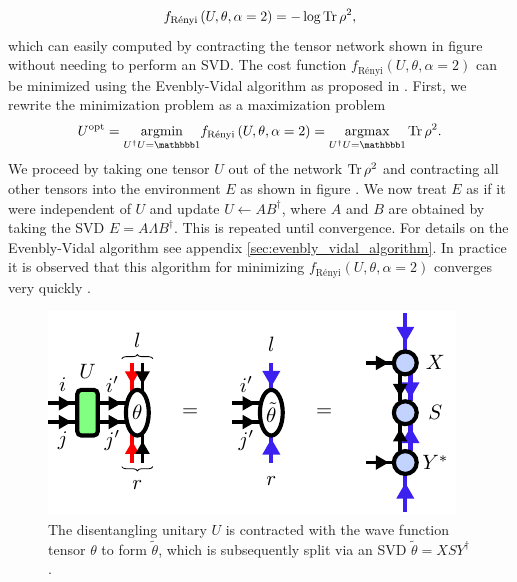 \begin{equation}
	\label{eq:renyi_entropy_alpha_2}
	f_\text{Rényi}\left(U,\theta,\alpha=2\right) = -\log\operatorname{Tr}\rho^2,
\end{equation}
which can easily computed by contracting the tensor network shown in figure  without needing to perform an SVD. The cost function $f_\text{Rényi}\left(U,\theta,\alpha=2\right)$ can be minimized using the Evenbly-Vidal algorithm as proposed in \cite{cite:finding_purifications_with_minimal_entanglement}. First, we rewrite the minimization problem as a maximization problem
\begin{equation}
	U^\text{opt} = \underset{U^\dagger U = \id}{\argmin} f_\text{Rényi}\left(U,\theta,\alpha=2\right) = \underset{U^\dagger U = \id}{\argmax}\Tr\rho^2.
\end{equation}
We proceed by taking one tensor $U$ out of the network $\operatorname{Tr}\rho^2$ and contracting all other tensors into the environment $E$ as shown in figure . We now treat $E$ as if it were independent of $U$ and update $U\leftarrow AB^\dagger$, where $A$ and $B$ are obtained by taking the SVD $E=A\Lambda B^\dagger$. This is repeated until convergence. For details on the Evenbly-Vidal algorithm see appendix \ref{sec:evenbly_vidal_algorithm}. In practice it is observed that this algorithm for minimizing $f_\text{Rényi}\left(U,\theta,\alpha=2\right)$ converges very quickly \cite{cite:efficient_simulation_of_dynamics_in_two_dimensional_quantum_spin_systems}.\par
\begin{figure}
	\centering
	\includegraphics[scale=1]{figures/tikz/disoTPS/theta_tilde_contraction/theta_tilde_contraction.pdf}
	\caption{The disentangling unitary $U$ is contracted with the wave function tensor $\theta$ to form $\tilde{\theta}$, which is subsequently split via an SVD $\tilde{\theta} = XSY^\dagger$.}
	\label{fig:disentangling_theta_definition}
\end{figure}
